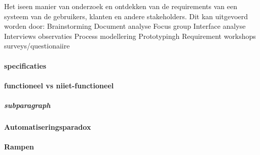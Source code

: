 \documentclass[11pt]{report} %
\begin{document}
Het iseen manier van onderzoek en ontdekken van de requirements van een systeem van de gebruikers, klanten en andere stakeholders.
Dit kan uitgevoerd worden door:
Brainstorming
Document analyse
Focus group
Interface analyse
Interviews observaties
Process modellering
Prototypingh
Requirement workshops
surveys/questionaiire

\paragraph{specificaties}

\paragraph{functioneel vs niiet-functioneel}


\subparagraph{subparagraph}


\paragraph{Automatiseringsparadox}



\paragraph{Rampen}
\end{document}
